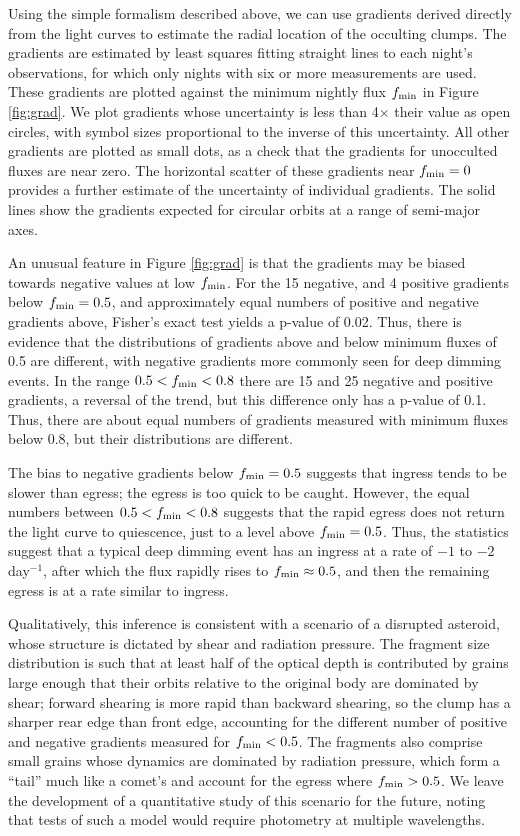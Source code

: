 \documentclass[]{rsos}
\begin{document}
Using the simple formalism described above, we can use gradients derived directly from
the light curves to estimate the radial location of the occulting clumps. The gradients
are estimated by least squares fitting straight lines to each night's observations, for
which only nights with six or more measurements are used. These gradients are plotted
against the minimum nightly flux $f_{\rm min}$ in Figure \ref{fig:grad}. We plot
gradients whose uncertainty is less than 4$\times$ their value as open circles, with
symbol sizes proportional to the inverse of this uncertainty. All other gradients are
plotted as small dots, as a check that the gradients for unocculted fluxes are near
zero. The horizontal scatter of these gradients near $f_{\rm min}=0$ provides a further
estimate of the uncertainty of individual gradients. The solid lines show the gradients
expected for circular orbits at a range of semi-major axes.

An unusual feature in Figure \ref{fig:grad} is that the gradients may be biased towards
negative values at low $f_{\rm min}$. For the 15 negative, and 4 positive gradients below
$f_{\rm min}=0.5$, and approximately equal numbers of positive and negative gradients
above, Fisher's exact test yields a p-value of 0.02. Thus, there is evidence that the
distributions of gradients above and below minimum fluxes of 0.5 are different, with
negative gradients more commonly seen for deep dimming events. In the range
$0.5<f_{\rm min}<0.8$ there are 15 and 25 negative and positive gradients, a reversal of
the trend, but this difference only has a p-value of 0.1. Thus, there are about equal
numbers of gradients measured with minimum fluxes below 0.8, but their distributions are
different.

The bias to negative gradients below $f_{\rm min}=0.5$ suggests that ingress tends to be
slower than egress; the egress is too quick to be caught. However, the equal numbers
between $0.5 < f_{\rm min} < 0.8$ suggests that the rapid egress does not return the
light curve to quiescence, just to a level above $f_{\rm min}=0.5$. Thus, the statistics
suggest that a typical deep dimming event has an ingress at a rate of $-1$ to $-2$
day$^{-1}$, after which the flux rapidly rises to $f_{\rm min} \approx 0.5$, and then the
remaining egress is at a rate similar to ingress.

Qualitatively, this inference is consistent with a scenario of a disrupted asteroid,
whose structure is dictated by shear and radiation pressure. The fragment size
distribution is such that at least half of the optical depth is contributed by grains
large enough that their orbits relative to the original body are dominated by shear;
forward shearing is more rapid than backward shearing, so the clump has a sharper rear
edge than front edge, accounting for the different number of positive and negative
gradients measured for $f_{\rm min} < 0.5$. The fragments also comprise small grains
whose dynamics are dominated by radiation pressure, which form a ``tail'' much like a
comet's and account for the egress where $f_{\rm min} > 0.5$. We leave the development of
a quantitative study of this scenario for the future, noting that tests of such a model
would require photometry at multiple wavelengths.
\end{document}

